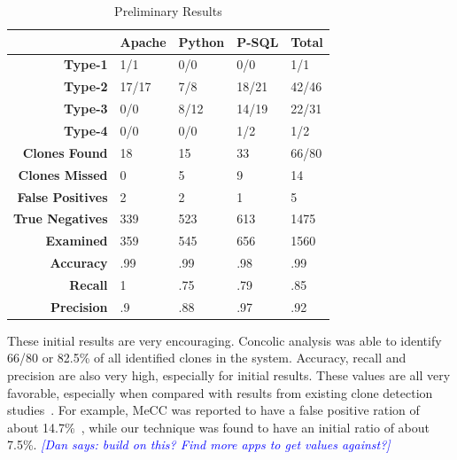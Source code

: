 \documentclass{sig-alternate}
\newcommand{\dan}[1]{\textcolor{blue}{{\it [Dan says: #1]}}}
\begin{document}
\begin{table}[thb!]
\begin{center}
\label{table:discoveredclones}
\caption{Preliminary Results}
    \begin{tabular}{ r | l | l | l | l }
    \toprule
    	 &\bfseries Apache & \bfseries Python &\bfseries P-SQL & \bfseries Total  \\ \hline\hline
    	\bfseries Type-1  & 1/1  & 0/0   & 0/0 & 1/1 \\ \hline
	\bfseries Type-2  & 17/17  & 7/8   & 18/21 & 42/46\\ \hline
	\bfseries Type-3  & 0/0  & 8/12  & 14/19 & 22/31\\ \hline
	\bfseries Type-4  & 0/0  & 0/0   & 1/2 & 1/2\\ \hline
	\bfseries Clones Found & 18  & 15 & 33 & 66/80 \\ \hline
	\bfseries Clones Missed  & 0  & 5 & 9 & 14 \\ \hline
	\bfseries False Positives  & 2  & 2 & 1 & 5 \\ \hline
	\bfseries True Negatives & 339  & 523 & 613 & 1475 \\ \hline 
	\bfseries Examined & 359  & 545 & 656 & 1560 \\ \hline  \hline
	\bfseries Accuracy  & .99  & .99 & .98 & .99 \\ \hline 
	\bfseries Recall  & 1  & .75 & .79 & .85 \\  \hline 
	\bfseries Precision  & .9  & .88 & .97 & .92 \\ 


    \end{tabular}
\end{center}
\vspace{-0.1in}
\end{table}



These initial results are very encouraging. Concolic analysis was able to identify 66/80 or 82.5\% of all identified clones in the system. Accuracy, recall and precision are also very high, especially for initial results. These values are all very favorable, especially when compared with results from existing clone detection studies~\cite{Yuan:2011:CCM:2114489.2114766}. For example, MeCC was reported to have a false positive ration of about 14.7\%~\cite{Kim:2011:MMC:1985793.1985835}, while our technique was found to have an initial ratio of about 7.5\%. \dan{build on this? Find more apps to get values against?}
\end{document}

